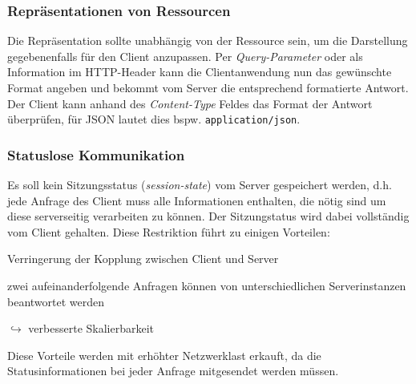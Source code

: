 \subsubsection{Repräsentationen von Ressourcen}
\label{sec:representationofresources}

Die Repräsentation sollte unabhängig von der Ressource sein, um die Darstellung gegebenenfalls für den Client anzupassen. Per \emph{Query-Parameter} oder als Information im HTTP-Header kann die Clientanwendung nun das gewünschte Format angeben und bekommt vom Server die entsprechend formatierte Antwort. Der Client kann anhand des \emph{Content-Type} Feldes das Format der Antwort überprüfen, für \gls{JSON} lautet dies bspw. \texttt{application/json}.

\subsubsection{Statuslose Kommunikation}

Es soll kein Sitzungsstatus (\emph{session-state}) vom Server gespeichert werden, d.h. jede Anfrage des Client muss alle Informationen enthalten, die nötig sind um diese serverseitig verarbeiten zu können. Der Sitzungstatus wird dabei vollständig vom Client gehalten. Diese Restriktion führt zu einigen Vorteilen:
\begin{compactitem}
    \item Verringerung der Kopplung zwischen Client und Server
    \item zwei aufeinanderfolgende Anfragen können von unterschiedlichen Serverinstanzen beantwortet werden
    \item[$\hookrightarrow$] verbesserte Skalierbarkeit
\end{compactitem}
Diese Vorteile werden mit erhöhter Netzwerklast erkauft, da die Statusinformationen bei jeder Anfrage mitgesendet werden müssen.